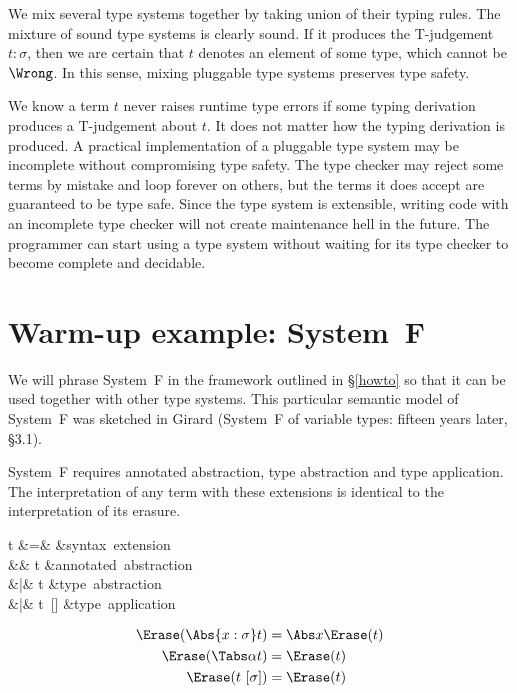 \documentclass{amsart}
\theoremstyle{definition}
\begin{document}
We mix several type systems together by taking union of their
typing rules. The mixture of sound type systems is clearly sound.
If it produces the T-judgement $t:\sigma$, then we are
certain that $t$ denotes an element of some type, which cannot be
$\Wrong$. In this sense, mixing pluggable type systems preserves
type safety.

We know a term $t$ never raises runtime type errors if some
typing derivation produces a T-judgement about $t$. It does
not matter how the typing derivation is produced. A practical
implementation of a pluggable type system may be incomplete
without compromising type safety. The type checker may reject
some terms by mistake and loop forever on others, but the terms
it does accept are guaranteed to be type safe. Since the type
system is extensible, writing code with an incomplete type
checker will not create maintenance hell in the future. The
programmer can start using a type system without waiting for its
type checker to become complete and decidable.



\section{Warm-up example: System~F}

We will phrase System~F in the framework outlined in
\S\ref{howto} so that it can be used together with other type
systems. This particular semantic model of System~F was sketched
in Girard (System~F of variable types: fifteen years later,
\S3.1).


System~F requires annotated abstraction, type abstraction and
type application. The interpretation of any term with these
extensions is identical to the interpretation of its erasure.

\begin{syntax}
t &\+=& &\mbox{syntax extension} \\
&& t &\mbox{annotated abstraction}\\
&|& \Tabs\alpha t &\mbox{type abstraction}\\
&|& t~[\sigma] &\mbox{type application}
\end{syntax}%

\begin{align*}
\Erase(\Abs{x:\sigma}t) & = \Abs x\Erase(t) \\
\Erase(\Tabs\alpha t) &= \Erase(t) \\
\Erase(t~[\sigma]) &= \Erase(t)
\end{align*}
\end{document}
